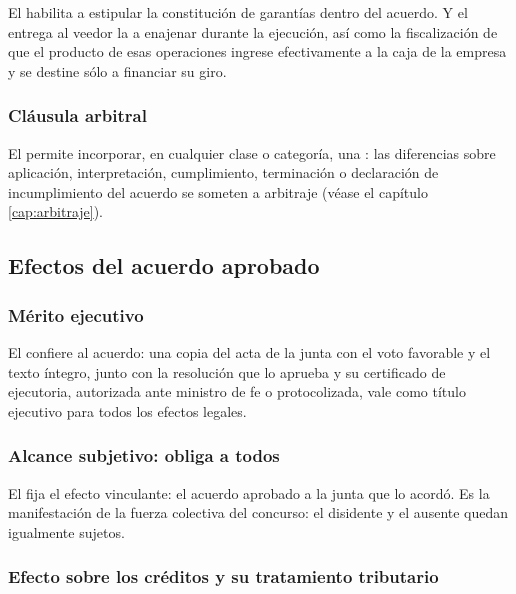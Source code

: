 El  habilita a estipular la constitución de garantías dentro del acuerdo. Y el
 entrega al veedor la  a enajenar durante la
ejecución, así como la fiscalización de que el producto de esas operaciones ingrese
efectivamente a la caja de la empresa y se destine sólo a financiar su giro.

\subsubsection{Cláusula arbitral}

El  permite incorporar, en cualquier clase o categoría, una : las diferencias sobre aplicación, interpretación, cumplimiento, terminación o
declaración de incumplimiento del acuerdo se someten a arbitraje (véase el capítulo
\ref{cap:arbitraje}).

\subsection{Efectos del acuerdo aprobado}

\subsubsection{Mérito ejecutivo}

El  confiere  al acuerdo: una copia del acta de la junta con
el voto favorable y el texto íntegro, junto con la resolución que lo aprueba y su certificado
de ejecutoria, autorizada ante ministro de fe o protocolizada, vale como título ejecutivo para
todos los efectos legales.

\subsubsection{Alcance subjetivo: obliga a todos}

El  fija el efecto vinculante: el acuerdo aprobado  a la junta que lo acordó. Es la
manifestación de la fuerza colectiva del concurso: el disidente y el ausente quedan igualmente
sujetos.

\subsubsection{Efecto sobre los créditos y su tratamiento tributario}

